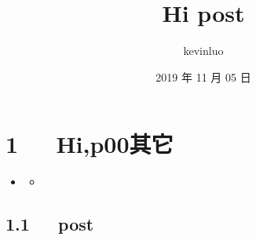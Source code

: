 \documentclass[letterpaper,12pt,english]{sphinxmanual}
\title{Hi post}
\date{2019 年 11 月 05 日}
\author{kevinluo}
\begin{document}
\pagestyle{empty}
\sphinxmaketitle
\pagestyle{plain}
\sphinxtableofcontents
\pagestyle{normal}
\label{\detokenize{index::doc}}



\chapter{1   Hi,p00其它}
\label{\detokenize{p00_u5176_u5b83/Hello_uff0cp00_u5176_u5b83:hi-p00}}\label{\detokenize{p00_u5176_u5b83/Hello_uff0cp00_u5176_u5b83::doc}}
\begin{sphinxShadowBox}
\begin{itemize}
\item {} 
\label{\detokenize{p00_u5176_u5b83/Hello_uff0cp00_u5176_u5b83:id2}}{\hyperref[\detokenize{p00_u5176_u5b83/Hello_uff0cp00_u5176_u5b83:hi-p00}]{}}
\begin{itemize}
\item {} 
\label{\detokenize{p00_u5176_u5b83/Hello_uff0cp00_u5176_u5b83:id3}}{\hyperref[\detokenize{p00_u5176_u5b83/Hello_uff0cp00_u5176_u5b83:post}]{}}

\end{itemize}

\end{itemize}
\end{sphinxShadowBox}


\section{1.1   post}
\label{\detokenize{p00_u5176_u5b83/Hello_uff0cp00_u5176_u5b83:post}}
\end{document}
